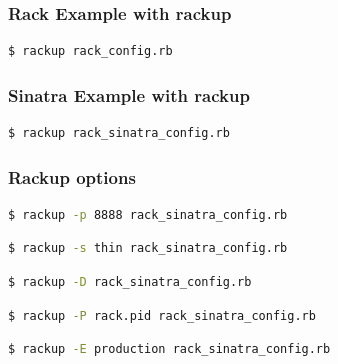 \documentclass{beamer}
\begin{document}
\begin{frame}[fragile]\frametitle{Rack Example with rackup}
  

  

  \begin{lstlisting}[language=bash, escapechar={^}]
$ rackup rack_config.rb
  \end{lstlisting}
\end{frame}




\begin{frame}[fragile]\frametitle{Sinatra Example with rackup}
  

  

  \begin{lstlisting}[language=bash, escapechar={^}]
$ rackup rack_sinatra_config.rb
  \end{lstlisting}
\end{frame}





\begin{frame}[fragile]\frametitle{Rackup options}

  \begin{lstlisting}[language=bash, escapechar={^}]
$ rackup -p 8888 rack_sinatra_config.rb
  \end{lstlisting}

  \begin{lstlisting}[language=bash, escapechar={^}]
$ rackup -s thin rack_sinatra_config.rb
  \end{lstlisting}

  \begin{lstlisting}[language=bash, escapechar={^}]
$ rackup -D rack_sinatra_config.rb
  \end{lstlisting}

  \begin{lstlisting}[language=bash, escapechar={^}]
$ rackup -P rack.pid rack_sinatra_config.rb
  \end{lstlisting}

  \begin{lstlisting}[language=bash, escapechar={^}]
$ rackup -E production rack_sinatra_config.rb
  \end{lstlisting}
  
\end{frame}
\end{document}
